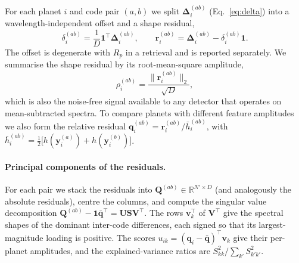 For each planet $i$ and code pair $(a,b)$ we split $\bm{\Delta}_i^{(ab)}$ (Eq.~\ref{eq:delta}) into a wavelength-independent offset and a shape residual,
\begin{equation}
  \delta_i^{(ab)} = \frac{1}{D}\mathbf{1}^{\top}\bm{\Delta}_i^{(ab)},\qquad
  \mathbf{r}_i^{(ab)} = \bm{\Delta}_i^{(ab)} - \delta_i^{(ab)}\mathbf{1}.
  \label{eq:offset}
\end{equation}
The offset is degenerate with $R_p$ in a retrieval and is reported separately.
We summarise the shape residual by its root-mean-square amplitude,
\begin{equation}
  \rho_i^{(ab)} = \frac{\lVert\mathbf{r}_i^{(ab)}\rVert_2}{\sqrt{D}},
  \label{eq:rho}
\end{equation}
which is also the noise-free signal available to any detector that operates on mean-subtracted spectra.
To compare planets with different feature amplitudes we also form the relative residual $\mathbf{q}_i^{(ab)} = \mathbf{r}_i^{(ab)}/\bar{h}_i^{(ab)}$, with $\bar{h}_i^{(ab)} = \tfrac{1}{2}\bigl[h(\mathbf{y}_i^{(a)})+h(\mathbf{y}_i^{(b)})\bigr]$.

\paragraph{Principal components of the residuals.}
For each pair we stack the residuals into $\mathbf{Q}^{(ab)}\in\mathbb{R}^{N'\times D}$ (and analogously the absolute residuals), centre the columns, and compute the singular value decomposition $\mathbf{Q}^{(ab)}-\mathbf{1}\bar{\mathbf{q}}^{\top}=\mathbf{U}\mathbf{S}\mathbf{V}^{\top}$.
The rows $\mathbf{v}_k^{\top}$ of $\mathbf{V}^{\top}$ give the spectral shapes of the dominant inter-code differences, each signed so that its largest-magnitude loading is positive.
The scores $u_{ik}=(\mathbf{q}_i-\bar{\mathbf{q}})^{\top}\mathbf{v}_k$ give their per-planet amplitudes, and the explained-variance ratios are $S_{kk}^{2}/\sum_{k'}S_{k'k'}^{2}$.

